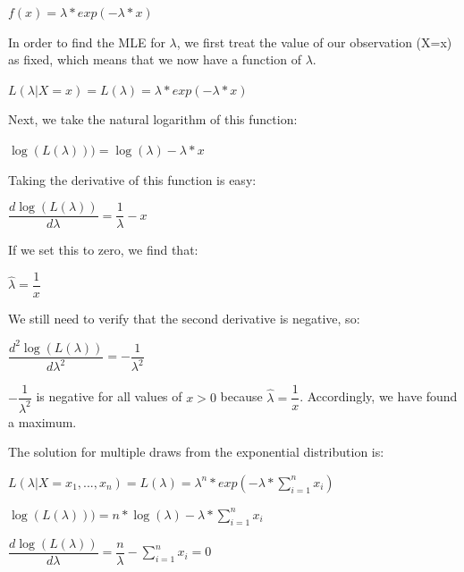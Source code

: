 \documentclass[12pt]{article}\usepackage[]{graphicx}\usepackage[]{color}
\begin{document}
\bigskip

$f(x) = \lambda * exp(-\lambda*x)$

\bigskip

In order to find the MLE for $\lambda$, we first treat the value of our observation (X=x) as fixed, which means that we now have a function of $\lambda$.

\bigskip

$L(\lambda | X = x) = L(\lambda) = \lambda * exp(-\lambda*x)$

\bigskip

Next, we take the natural logarithm of this function:

\bigskip

$\log(L(\lambda))) = \log(\lambda) - \lambda *x$

\bigskip

Taking the derivative of this function is easy:

\bigskip

$\dfrac{d \log(L(\lambda))}{d \lambda} = \dfrac{1}{\lambda} - x$

\bigskip

If we set this to zero, we find that:

\bigskip

$\hat{\lambda} = \dfrac{1}{x}$

\bigskip

We still need to verify that the second derivative is negative, so:

\bigskip

$\dfrac{d^2 \log(L(\lambda))}{d \lambda^2} = - \dfrac{1}{\lambda^2}$

\bigskip

$- \dfrac{1}{\lambda^2}$ is negative for all values of $x > 0$ because $\hat{\lambda} = \dfrac{1}{x}$. Accordingly, we have found a maximum.

\bigskip

The solution for multiple draws from the exponential distribution is:

\bigskip

$L(\lambda | X = x_1, ..., x_n) = L(\lambda) = \lambda ^n * exp(-\lambda*\sum_{i=1}^{n} x_i)$

\bigskip

$\log(L(\lambda))) = n * \log(\lambda) - \lambda * \sum_{i=1}^{n} x_i$

\bigskip

$\dfrac{d \log(L(\lambda))}{d \lambda} = \dfrac{n}{\lambda} - \sum_{i=1}^{n} x_i = 0$

\bigskip
\end{document}
